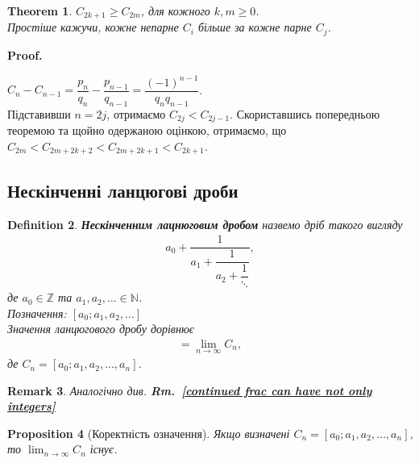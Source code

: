 \documentclass[a4paper, 10pt]{article}
\makeatletter
\theoremstyle{theoremdd}
\newtheorem{theorem}{Theorem}[subsection]
\theoremstyle{theoremdd}
\newtheorem{definition}[theorem]{Definition}
\theoremstyle{theoremdd}
\theoremstyle{theoremdd}
\theoremstyle{theoremdd}
\newtheorem{proposition}[theorem]{Proposition}
\theoremstyle{theoremdd}
\newtheorem{remark}[theorem]{Remark}
\theoremstyle{theoremdd}
\theoremstyle{theoremdd}
\renewenvironment{proof}[1][Proof.\\]{\par
\pushQED{\hfill \qed}%
\normalfont \topsep6\p@\@plus6\p@\relax
\trivlist
\item\relax
{\bfseries
#1\@addpunct{.}}\hspace\labelsep\ignorespaces
}{%
\popQED\endtrivlist\@endpefalse
}
\newcommand\rmref[1]{\textbf{Rm.~\ref{#1}}}
\makeatother
\begin{document}
\begin{theorem}
$C_{2k+1} \geq C_{2m}$, для кожного $k,m \geq 0$. \\
Простіше кажучи, кожне непарне $C_i$ більше за кожне парне $C_j$.
\end{theorem}

\begin{proof}
$C_n - C_{n-1} = \dfrac{p_n}{q_n} - \dfrac{p_{n-1}}{q_{n-1}} = \dfrac{(-1)^{n-1}}{q_nq_{n-1}}$.\\
Підставивши $n = 2j$, отримаємо $C_{2j} < C_{2j-1}$. Скориставшись попередньою теоремою та щойно одержаною оцінкою, отримаємо, що\\
$C_{2m} < C_{2m + 2k + 2} < C_{2m + 2k + 1} < C_{2k+1}$.
\end{proof}

\subsection{Нескінченні ланцюгові дроби}
\begin{definition}
\textbf{Нескінченним лацнюговим дробом} назвемо дріб такого вигляду
\begin{align*}
a_0 + \dfrac{1}{a_1 + \dfrac{1}{a_2 + \dfrac{1}{\ddots }}},
\end{align*}
де $a_0 \in \mathbb{Z}$ та $a_1,a_2,\dots \in \mathbb{N}$.\\
Позначення: $[a_0;a_1,a_2,\dots]$\\
Значення ланцюгового дробу дорівнює
\begin{align*}
[a_0;a_1,a_2,\dots] = \lim_{n \to \infty} C_n,
\end{align*}
де $C_n = [a_0;a_1,a_2,\dots,a_n]$.
\end{definition}

\begin{remark}
Аналогічно див. \rmref{continued frac can have not only integers}
\end{remark}

\begin{proposition}[Коректність означення]
Якщо визначені $C_n = [a_0;a_1,a_2,\dots,a_n]$, то $\displaystyle\lim_{n \to \infty} C_n$ існує.
\end{proposition}
\end{document}
